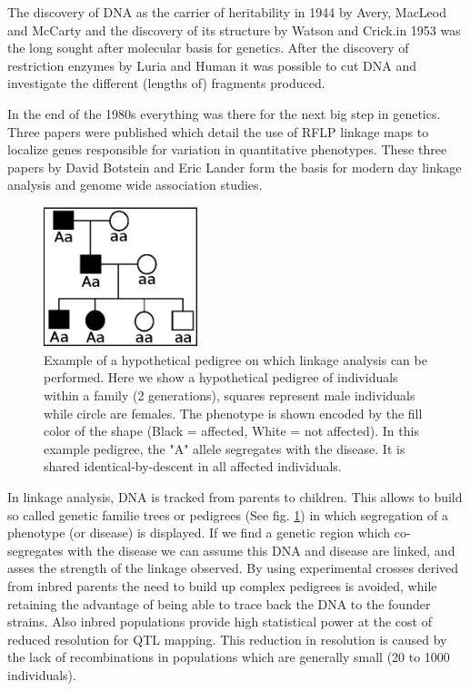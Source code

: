 The discovery of DNA as the carrier of heritability in 1944 by Avery, MacLeod and McCarty 
\cite{Avery:1944} and the discovery of its structure by Watson and Crick.in 1953 
\cite{Watson:1953} was the long sought after molecular basis for genetics. After the 
discovery of restriction enzymes by Luria and Human \cite{Luria:1952} it was possible 
to cut DNA and investigate the different (lengths of) fragments produced.

In the end of the 1980s everything was there for the next big step in genetics. Three 
papers were published which detail the use of RFLP linkage maps to localize genes 
responsible for variation in quantitative phenotypes. These three papers by David Botstein 
and Eric Lander \cite{Lander:1986, Lander:1987, Lander:1989} form the basis for modern 
day linkage analysis and genome wide association studies. 

\begin{figure}[h!]
 \centering
    \includegraphics[width=0.4\textwidth]{eps/image_1_2}
  \caption[Example of pedigree based linkage analysis.]
    {Example of a hypothetical pedigree on which linkage analysis can be performed. Here we show a 
    hypothetical pedigree of individuals within a family (2 generations), squares represent 
    male individuals while circle are females. The phenotype is shown encoded by the fill 
    color of the shape (Black = affected, White = not affected).  In this example pedigree, 
    the "A" allele segregates with the disease. It is shared identical-by-descent in all 
    affected individuals. }
    \label{fig:pedigree}
\end{figure}

In linkage analysis, DNA is tracked from parents to children. This allows to build so called 
genetic familie trees or pedigrees (See fig. \ref{fig:pedigree}) in which segregation of a phenotype (or 
disease) is displayed. If we find a genetic region which co-segregates with the disease we can assume this DNA and 
disease are linked, and asses the strength of the linkage observed. By using experimental 
crosses derived from inbred parents the need to build up complex pedigrees is avoided, while 
retaining the advantage of being able to trace back the DNA to the founder strains. Also inbred 
populations provide high statistical power at the cost of reduced resolution for QTL mapping. 
This reduction in resolution is caused by the lack of recombinations in populations which are 
generally small (20 to 1000 individuals).

